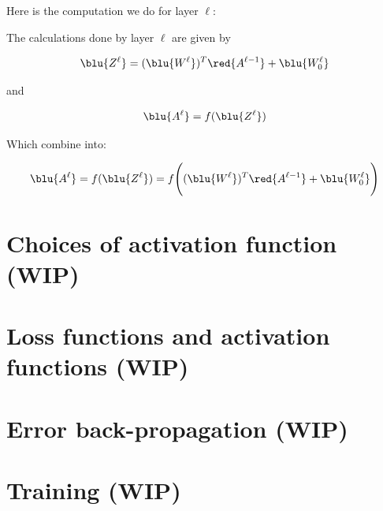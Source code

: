         Here is the computation we do for layer $\ell$:\\
        
        \begin{kequation}
            The calculations done by layer $\ell$ are given by
            
            \begin{equation*}
                \blu{Z^\ell} = (\blu{W^\ell})^T \red{A^{\ell-1}} + \blu{W_0^\ell} 
            \end{equation*}
            
            and
            
            \begin{equation*}
                \blu{A^\ell} = f(\blu{Z^\ell})
            \end{equation*}
            
            Which combine into:
            
            \begin{equation*}
                \blu{A^\ell} = f(\blu{Z^\ell}) = 
                f  
                \Bigg( 
                    (\blu{W^\ell})^T \red{A^{\ell-1}} + \blu{W_0^\ell} 
                \Bigg)
            \end{equation*}
        \end{kequation}
        
        
    
\section{Choices of activation function (WIP)}
\section{Loss functions and activation functions (WIP)}
\section{Error back-propagation (WIP)}
\section{Training (WIP)}

